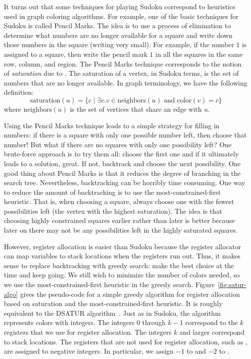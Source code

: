 \documentclass[11pt]{book}
\begin{document}
{It turns out that some techniques for playing Sudoku correspond to
heuristics used in graph coloring algorithms.  For example, one of the
basic techniques for Sudoku is called Pencil Marks. The idea is to use
a process of elimination to determine what numbers are no longer
available for a square and write down those numbers in the square
(writing very small). For example, if the number $1$ is assigned to a
square, then write the pencil mark $1$ in all the squares in the same
row, column, and region.
%
The Pencil Marks technique corresponds to the notion of
\emph{saturation} due to \cite{Brelaz:1979eu}.  The
saturation of a vertex, in Sudoku terms, is the set of numbers that
are no longer available. In graph terminology, we have the following
definition:
\begin{equation*}
  \mathrm{saturation}(u) = \{ c \mid \exists v. v \in \mathrm{neighbors}(u)
     \text{ and } \mathrm{color}(v) = c \}
\end{equation*}
where $\mathrm{neighbors}(u)$ is the set of vertices that share an
edge with $u$.

Using the Pencil Marks technique leads to a simple strategy for
filling in numbers: if there is a square with only one possible number
left, then choose that number! But what if there are no squares with
only one possibility left? One brute-force approach is to try them
all: choose the first one and if it ultimately leads to a solution,
great.  If not, backtrack and choose the next possibility.  One good
thing about Pencil Marks is that it reduces the degree of branching in
the search tree. Nevertheless, backtracking can be horribly time
consuming. One way to reduce the amount of backtracking is to use the
most-constrained-first heuristic. That is, when choosing a square,
always choose one with the fewest possibilities left (the vertex with
the highest saturation).  The idea is that choosing highly constrained
squares earlier rather than later is better because later on there may
not be any possibilities left in the highly saturated squares.

However, register allocation is easier than Sudoku because the
register allocator can map variables to stack locations when the
registers run out. Thus, it makes sense to replace backtracking with
greedy search: make the best choice at the time and keep going. We
still wish to minimize the number of colors needed, so we use the
most-constrained-first heuristic in the greedy search.
Figure~\ref{fig:satur-algo} gives the pseudo-code for a simple greedy
algorithm for register allocation based on saturation and the
most-constrained-first heuristic. It is roughly equivalent to the
DSATUR
algorithm~\citep{Brelaz:1979eu,Gebremedhin:1999fk,Omari:2006uq}.  Just
as in Sudoku, the algorithm represents colors with integers. The
integers $0$ through $k-1$ correspond to the $k$ registers that we use
for register allocation. The integers $k$ and larger correspond to
stack locations. The registers that are not used for register
allocation, such as , are assigned to negative integers. In
particular, we assign $-1$ to  and $-2$ to .

}
\end{document}
